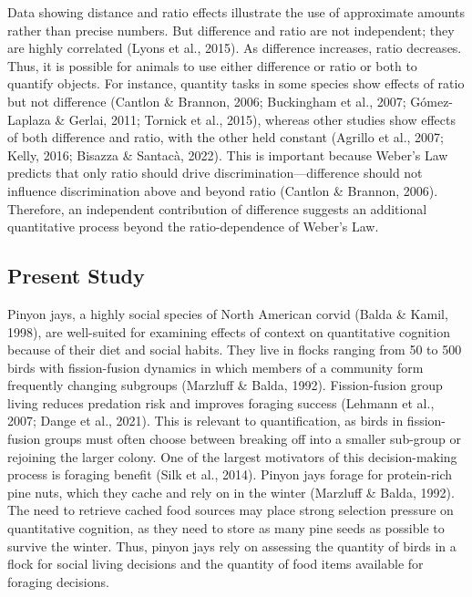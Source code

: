 \documentclass[
  ,pub,floatsintext]{apa6}
\begin{document}
Data showing distance and ratio effects illustrate the use of approximate amounts rather than precise numbers. But difference and ratio are not independent; they are highly correlated (Lyons et al., 2015). As difference increases, ratio decreases. Thus, it is possible for animals to use either difference or ratio or both to quantify objects. For instance, quantity tasks in some species show effects of ratio but not difference (Cantlon \& Brannon, 2006; Buckingham et al., 2007; Gómez-Laplaza \& Gerlai, 2011; Tornick et al., 2015), whereas other studies show effects of both difference and ratio, with the other held constant (Agrillo et al., 2007; Kelly, 2016; Bisazza \& Santacà, 2022). This is important because Weber's Law predicts that only ratio should drive discrimination---difference should not influence discrimination above and beyond ratio (Cantlon \& Brannon, 2006). Therefore, an independent contribution of difference suggests an additional quantitative process beyond the ratio-dependence of Weber's Law.

\hypertarget{present-study}{%
\subsection{Present Study}\label{present-study}}

Pinyon jays, a highly social species of North American corvid (Balda \& Kamil, 1998), are well-suited for examining effects of context on quantitative cognition because of their diet and social habits. They live in flocks ranging from 50 to 500 birds with fission-fusion dynamics in which members of a community form frequently changing subgroups (Marzluff \& Balda, 1992). Fission-fusion group living reduces predation risk and improves foraging success (Lehmann et al., 2007; Dange et al., 2021). This is relevant to quantification, as birds in fission-fusion groups must often choose between breaking off into a smaller sub-group or rejoining the larger colony. One of the largest motivators of this decision-making process is foraging benefit (Silk et al., 2014). Pinyon jays forage for protein-rich pine nuts, which they cache and rely on in the winter (Marzluff \& Balda, 1992). The need to retrieve cached food sources may place strong selection pressure on quantitative cognition, as they need to store as many pine seeds as possible to survive the winter. Thus, pinyon jays rely on assessing the quantity of birds in a flock for social living decisions and the quantity of food items available for foraging decisions.
\end{document}
